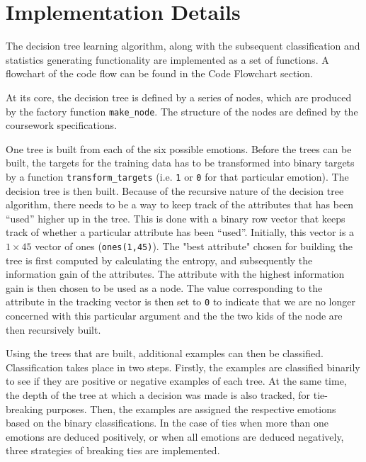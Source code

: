 \documentclass[a4paper]{article}
\begin{document}

\section{Implementation Details}

The decision tree learning algorithm, along with the subsequent classification and statistics generating functionality are implemented as a set of functions. A flowchart of the code flow can be found in the Code Flowchart section.\medskip

At its core, the decision tree is defined by a series of nodes, which are produced by the factory function \texttt{make\_node}. The structure of the nodes are defined by the coursework specifications.\medskip

One tree is built from each of the six possible emotions. Before the trees can be built, the targets for the training data has to be transformed into binary targets by a function \texttt{transform\_targets} (i.e. \texttt{1} or \texttt{0} for that particular emotion). The decision tree is then built. Because of the recursive nature of the decision tree algorithm, there needs to be a way to keep track of the attributes that has been “used” higher up in the tree. This is done with a binary row vector that keeps track of whether a particular attribute has been “used”. Initially, this vector is a $1\times45$ vector of ones (\texttt{ones(1,45)}). The "best attribute" chosen for building the tree is first computed by calculating the entropy, and subsequently the information gain of the attributes. The attribute with the highest information gain is then chosen to be used as a node. The value corresponding to the attribute in the tracking vector is then set to \texttt{0} to indicate that we are no longer concerned with this particular argument and the the two kids of the node are then recursively built.\medskip

Using the trees that are built, additional examples can then be classified. Classification takes place in two steps. Firstly, the examples are classified binarily to see if they are positive or negative examples of each tree. At the same time, the depth of the tree at which a decision was made is also tracked, for tie-breaking purposes. Then, the examples are assigned the respective emotions based on the binary classifications. In the case of ties when more than one emotions are deduced positively, or when all emotions are deduced negatively, three strategies of breaking ties are implemented.\medskip
\end{document}
